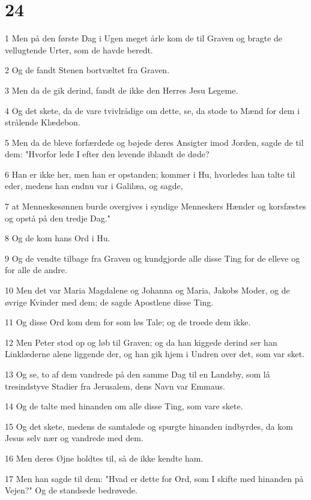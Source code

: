 \chapter{24}

\par 1 Men på den første Dag i Ugen meget årle kom de til Graven og bragte de vellugtende Urter, som de havde beredt.
\par 2 Og de fandt Stenen bortvæltet fra Graven.
\par 3 Men da de gik derind, fandt de ikke den Herres Jesu Legeme.
\par 4 Og det skete, da de vare tvivlrådige om dette, se, da stode to Mænd for dem i strålende Klædebon.
\par 5 Men da de bleve forfærdede og bøjede deres Ansigter imod Jorden, sagde de til dem: "Hvorfor lede I efter den levende iblandt de døde?
\par 6 Han er ikke her, men han er opstanden; kommer i Hu, hvorledes han talte til eder, medens han endnu var i Galilæa, og sagde,
\par 7 at Menneskesønnen burde overgives i syndige Menneskers Hænder og korsfæstes og opstå på den tredje Dag."
\par 8 Og de kom hans Ord i Hu.
\par 9 Og de vendte tilbage fra Graven og kundgjorde alle disse Ting for de elleve og for alle de andre.
\par 10 Men det var Maria Magdalene og Johanna og Maria, Jakobs Moder, og de øvrige Kvinder med dem; de sagde Apostlene disse Ting.
\par 11 Og disse Ord kom dem for som løs Tale; og de troede dem ikke.
\par 12 Men Peter stod op og løb til Graven; og da han kiggede derind ser han Linklæderne alene liggende der, og han gik hjem i Undren over det, som var sket.
\par 13 Og se, to af dem vandrede på den samme Dag til en Landsby, som lå tresindstyve Stadier fra Jerusalem, dens Navn var Emmaus.
\par 14 Og de talte med hinanden om alle disse Ting, som vare skete.
\par 15 Og det skete, medens de samtalede og spurgte hinanden indbyrdes, da kom Jesus selv nær og vandrede med dem.
\par 16 Men deres Øjne holdtes til, så de ikke kendte ham.
\par 17 Men han sagde til dem: "Hvad er dette for Ord, som I skifte med hinanden på Vejen?" Og de standsede bedrøvede.
